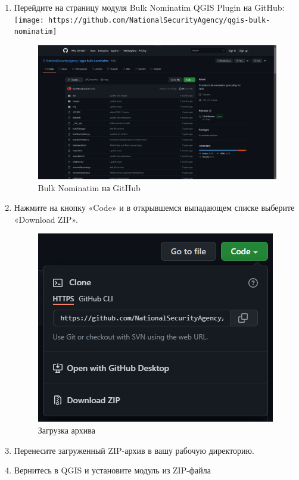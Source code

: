 \documentclass[
  12pt,
]{book}
\begin{document}
\begin{enumerate}
\def\labelenumi{\arabic{enumi}.}
\item
  Перейдите на страницу модуля Bulk Nominatim QGIS Plugin на GitHub: \texttt{[image: https://github.com/NationalSecurityAgency/qgis-bulk-nominatim]}

  \begin{figure}
  \centering
  \includegraphics{images/Ex08_Geocoding/bulk-nominatim01.png}
  \caption{Bulk Nominatim на GitHub}
  \end{figure}
\item
  Нажмите на кнопку «Code» и в открывшемся выпадающем списке выберите «Download ZIP».

  \begin{figure}
  \centering
  \includegraphics{images/Ex08_Geocoding/bulk-nominatim02.png}
  \caption{Загрузка архива}
  \end{figure}
\item
  Перенесите загруженный ZIP-архив в вашу рабочую директорию.
\item
  Вернитесь в QGIS и установите модуль из ZIP-файла


\end{enumerate}
\end{document}
